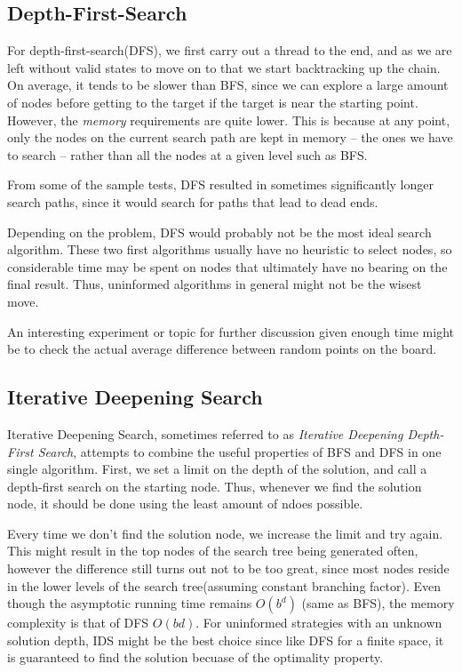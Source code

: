 \documentclass{article}
\begin{document}
\subsection{Depth-First-Search}
	For depth-first-search(DFS), we first carry out a thread to the end, and as we are left without valid 
	states to move on to that we start backtracking up the chain. On average, it tends to be slower than
	BFS, since we can explore a large amount of nodes before getting to the target if the target is near
	the starting point. However, the \textit{memory} requirements are quite lower. This is because at any 
	point, only the nodes on the current search path are kept in memory -- the ones we have to search --
	rather than all the nodes at a given level such as BFS. 

	
	From some of the sample tests, DFS resulted in sometimes significantly longer search paths,
	since it would search for paths that lead to dead ends.

	Depending on the problem, DFS would probably not be the most ideal search algorithm. These two first
	algorithms usually have no heuristic to select nodes, so considerable time may be spent on nodes
	that ultimately have no bearing on the final result. Thus, uninformed algorithms in general might
	not be the wisest move. 
	
	An interesting experiment or topic for further discussion given enough time might be 
	to check the actual average difference between random points on the board. 
\subsection{Iterative Deepening Search}
	Iterative Deepening Search, sometimes referred to as \textit{Iterative Deepening Depth-First Search},
	attempts to combine the useful properties of BFS and DFS in one single algorithm. First, we set a limit
	on the depth of the solution, and call a depth-first search on the starting node. Thus, whenever we find
	the solution node, it should be done using the least amount of ndoes possible.

	Every time we don't find the solution node, we increase the limit and try again. This might result
	in the top nodes of the search tree being generated often, however the difference still turns out not
	to be too great, since most nodes reside in the lower levels of the search tree(assuming constant 
	branching factor). Even though the 
	asymptotic running time remains $O(b^{d})$ (same as BFS), the memory complexity is that of DFS $O(bd)$.
	For uninformed strategies with an unknown solution depth, IDS might be the best choice since like DFS
	for a finite space, it is guaranteed to find the solution becuase of the optimality property.
\end{document}
